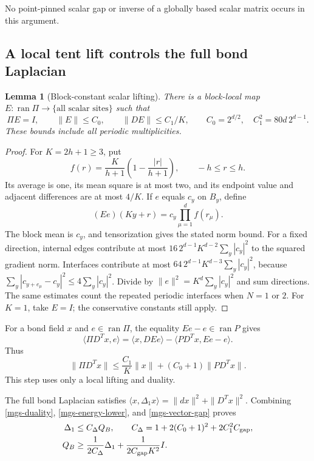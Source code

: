 \documentclass[11pt]{article}
\newtheorem{lemma}[theorem]{Lemma}
\theoremstyle{remark}
\begin{document}
No point-pinned scalar gap or inverse of a globally based scalar
matrix occurs in this argument.

\subsection{A local tent lift controls the full bond Laplacian}
\label{mgs-tent-section}

\begin{lemma}[Block-constant scalar lifting]
\label{mgs-tent-lemma}
There is a block-local map \(E:\operatorname{ran}\Pi\to
\{\text{all scalar sites}\}\) such that
\begin{equation}
 \Pi E=I,\qquad \|E\|\le C_0,\qquad
 \|DE\|\le C_1/K,\qquad
 C_0=2^{d/2},\quad C_1^2=80d\,2^{d-1}.
 \label{mgs-tent-bounds}
\end{equation}
These bounds include all periodic multiplicities.
\end{lemma}

\begin{proof}
For \(K=2h+1\ge3\), put
\[
 f(r)=\frac K{h+1}\left(1-\frac{|r|}{h+1}\right),
 \qquad -h\le r\le h.
\]
Its average is one, its mean square is at most two, and its
endpoint value and adjacent differences are at most \(4/K\).
If \(e\) equals \(c_y\) on \(B_y\), define
\[
 (Ee)(Ky+r)=c_y\prod_{\mu=1}^d f(r_\mu).
\]
The block mean is \(c_y\), and tensorization gives the stated
norm bound. For a fixed direction, internal edges contribute
at most
\(16\,2^{d-1}K^{d-2}\sum_y|c_y|^2\)
to the squared gradient norm.
Interfaces contribute at most
\(64\,2^{d-1}K^{d-3}\sum_y|c_y|^2\), because
\(\sum_y|c_{y+e_\mu}-c_y|^2\le4\sum_y|c_y|^2\).
Divide by
\(\|e\|^2=K^d\sum_y|c_y|^2\) and sum directions.
The same estimates count the repeated periodic interfaces when
\(N=1\) or \(2\).
For \(K=1\), take \(E=I\); the conservative constants still apply.
\end{proof}

For a bond field \(x\) and \(e\in\operatorname{ran}\Pi\),
the equality \(Ee-e\in\operatorname{ran}P\) gives
\[
 \langle\Pi D^Tx,e\rangle
  =\langle x,DEe\rangle-\langle PD^Tx,Ee-e\rangle.
\]
Thus
\begin{equation}
 \|\Pi D^Tx\|
 \le\frac{C_1}{K}\|x\|+(C_0+1)\|PD^Tx\|.
 \label{mgs-duality}
\end{equation}
This step uses only a local lifting and duality.

The full bond Laplacian satisfies
\(\langle x,\Delta_1x\rangle=\|dx\|^2+\|D^Tx\|^2\).
Combining \eqref{mgs-duality},
\eqref{mgs-energy-lower}, and \eqref{mgs-vector-gap}
proves
\begin{equation}
 \begin{split}
 \Delta_1&\le C_\Delta Q_B,\qquad
 C_\Delta=1+2(C_0+1)^2+2C_1^2C_{\rm gap},\\
 Q_B&\ge \frac1{2C_\Delta}\Delta_1
                         +\frac1{2C_{\rm gap}K^2}I.
 \end{split}
 \label{mgs-laplacian-domination}
\end{equation}
\end{document}
